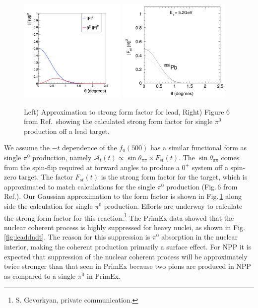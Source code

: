 \begin{figure}[tbh]
\begin{center}
\includegraphics[height=5cm,clip=true]{figures/fit_Primakoff_sigma_c1.png}
\includegraphics[height=5cm,clip=true]{figures/PRC80_2009_Fig6.png}
\caption{ Left) Approximation to strong form factor for lead, Right) Figure 6 from Ref.\,\cite{Gevorkyan:2009ge} showing the calculated strong form factor for single $\pi^0$ production off a lead target.
\label{fig:strongFF}}
\end{center}
\end{figure}

We assume the $-t$ dependence of the $f_0(500)$ has a similar functional form as single $\pi^0$ production, namely $\mathcal{A}_t(t) \propto \sin{\theta_{\pi\pi}} \times F_{st}(t)$.  The $\sin{\theta_{\pi\pi}}$ 
comes from the spin-flip required at forward angles to produce a $0^+$ system off a spin-zero target. The factor $F_{st}(t)$ is the strong form factor for the target, which is approximated to
match calculations for the single $\pi^0$ production (Fig.\,6 from Ref.\cite{Gevorkyan:2009ge}). Our Gaussian approximation to the form factor is shown in Fig.\,\ref{fig:strongFF} along side the calculation for single 
$\pi^0$ production. Efforts are underway to calculate the strong form factor for this reaction.\footnote{S. Gevorkyan, private communication.}
The PrimEx data showed that the nuclear coherent process is highly
suppressed for heavy nuclei, as shown in Fig.\ref{fig:leaddndt}.  The reason for this suppression is
$\pi^0$ absorption in the nuclear interior, making the coherent
production primarily a surface effect.  For NPP it is expected that suppression of the nuclear  
coherent process will be approximately twice stronger than that seen in PrimEx because two pions
are produced in NPP as compared to a single $\pi^0$ in PrimEx. 

